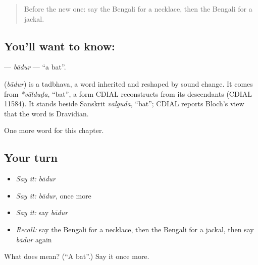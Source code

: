 \begin{quote}
Before the new one: say the Bengali for a necklace, then the Bengali for a jackal.
\end{quote}

\subsection*{You'll want to know: }
\textbf{} — \emph{bādur} — \textquotedblleft{}a bat\textquotedblright{}.

\begin{cousinweb}
\textbf{} (\emph{bādur}) is a tadbhava, a word inherited and reshaped by sound change. It comes from \emph{*vālduḍa}, \textquotedblleft{}bat\textquotedblright{}, a form CDIAL reconstructs from its descendants (CDIAL 11584). It stands beside Sanskrit \emph{vālguda}, \textquotedblleft{}bat\textquotedblright{}; CDIAL reports Bloch's view that the word is Dravidian.
\end{cousinweb}

\begin{grammarlens}[title={What you've built}]
One more word for this chapter.
\end{grammarlens}

\subsection*{Your turn}
\begin{itemize}
\raggedright
  \item \emph{Say it:} \emph{bādur}
  \item \emph{Say it:} \emph{bādur}, once more
  \item \emph{Say it:} say \emph{bādur}
  \item \emph{Recall:} say the Bengali for a necklace, then the Bengali for a jackal, then say \emph{bādur} again
\end{itemize}

\begin{tcolorbox}[breakable,colback=teal!4,colframe=teal!35!black,title={Before you move on}]
What does  mean? (\textquotedblleft{}A bat\textquotedblright{}.) Say it once more.
\end{tcolorbox}
